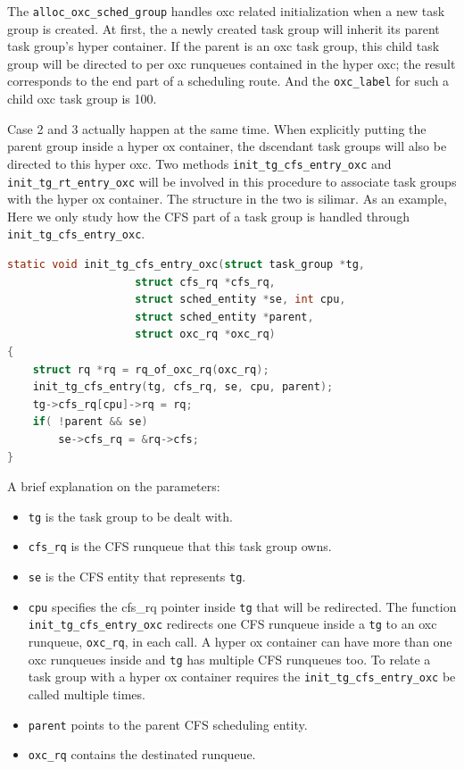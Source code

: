 The \texttt{alloc\_oxc\_sched\_group} handles oxc related initialization when a 
new task group is created. At first, the a newly created task group will inherit
its parent task group's hyper container. If the parent is an oxc task group, 
this child task group will be directed to per oxc runqueues contained in the
hyper oxc; the result corresponds to the end part of a scheduling route.  
And the \texttt{oxc\_label} for such a child oxc task group is 100.

Case 2 and 3 actually happen at the same time. When explicitly putting the 
parent group inside a hyper ox container, the dscendant task groups will also 
be directed to this hyper oxc. Two methods \texttt{init\_tg\_cfs\_entry\_oxc} and
\texttt{init\_tg\_rt\_entry\_oxc} will be involved in this procedure to 
associate task groups with the hyper ox container. 
The structure in the two is silimar. As an example, Here we only study how the 
CFS part of a task group is handled through \texttt{init\_tg\_cfs\_entry\_oxc}.

\begin{lstlisting}[language=C, caption={To explicitly direct a task group 
						(CFS part) to an OXC \\
					\indent\hspace{5cm} local runqueue}]
static void init_tg_cfs_entry_oxc(struct task_group *tg,
					struct cfs_rq *cfs_rq,
					struct sched_entity *se, int cpu,
					struct sched_entity *parent,
					struct oxc_rq *oxc_rq)
{
	struct rq *rq = rq_of_oxc_rq(oxc_rq);
	init_tg_cfs_entry(tg, cfs_rq, se, cpu, parent);
	tg->cfs_rq[cpu]->rq = rq;
	if( !parent && se)
		se->cfs_rq = &rq->cfs;
} 
\end{lstlisting}
A brief explanation on the parameters:
\begin{itemize}
\item \texttt{tg} is the task group to be dealt with.
\item \texttt{cfs\_rq} is the CFS runqueue that this task group 
		owns. 
\item \texttt{se} is the CFS entity that represents \texttt{tg}.
\item \texttt{cpu} specifies the cfs\_rq pointer inside \texttt{tg} that
		will be redirected. The function 
		\texttt{init\_tg\_cfs\_entry\_oxc}
		redirects one CFS runqueue inside a \texttt{tg} to an oxc 
		runqueue, \texttt{oxc\_rq}, in each call. A hyper ox 
		container can have more than one oxc runqueues inside
		and \texttt{tg} has multiple CFS runqueues too.
		To relate a task group with a hyper ox container requires 
		the \texttt{init\_tg\_cfs\_entry\_oxc} be called multiple times.
\item \texttt{parent} points to the parent CFS scheduling entity.
\item \texttt{oxc\_rq} contains the destinated runqueue. 
\end{itemize}

